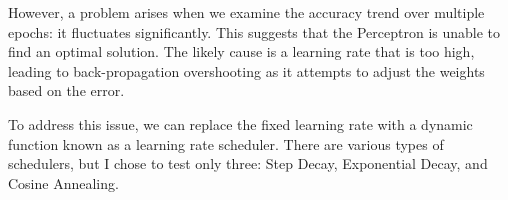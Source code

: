 \documentclass{article}
\begin{document}
However, a problem arises when we examine the accuracy trend over multiple epochs: it fluctuates significantly. This suggests that the Perceptron is unable to find an optimal solution. The likely cause is a learning rate that is too high, leading to back-propagation overshooting as it attempts to adjust the weights based on the error.

\begin{center}
\end{center}

\newpage

To address this issue, we can replace the fixed learning rate with a dynamic function known as a learning rate scheduler. There are various types of schedulers, but I chose to test only three: Step Decay, Exponential Decay, and Cosine Annealing.
\end{document}
